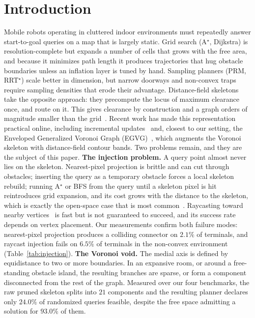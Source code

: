 \documentclass[conference]{IEEEtran}
\begin{document}
\section{Introduction}
Mobile robots operating in cluttered indoor environments must repeatedly answer start-to-goal queries on a map that is largely static. Grid search (A$^\star$, Dijkstra) is resolution-complete but expands a number of cells that grows with the free area, and because it minimizes path length it produces trajectories that hug obstacle boundaries unless an inflation layer is tuned by hand. Sampling planners (PRM, RRT$^\star$) scale better in dimension, but narrow doorways and non-convex traps require sampling densities that erode their advantage.
Distance-field skeletons take the opposite approach: they precompute the locus of maximum clearance once, and route on it. This gives clearance by construction and a graph orders of magnitude smaller than the grid~\cite{lau2013,oleynikova2018,qi2022pruned}. Recent work has made this representation practical online, including incremental updates~\cite{lau2013} and, closest to our setting, the Enveloped Generalized Voronoi Graph (EGVG)~\cite{qi2025egvg}, which augments the Voronoi skeleton with distance-field contour bands.
Two problems remain, and they are the subject of this paper.
\textbf{The injection problem.} A query point almost never lies on the skeleton. Nearest-pixel projection is brittle and can cut through obstacles; inserting the query as a temporary obstacle forces a local skeleton rebuild; running A$^\star$ or BFS from the query until a skeleton pixel is hit reintroduces grid expansion, and its cost grows with the distance to the skeleton, which is exactly the open-space case that is most common~\cite{qi2025egvg,oleynikova2018}. Raycasting toward nearby vertices~\cite{qi2025egvg} is fast but is not guaranteed to succeed, and its success rate depends on vertex placement. Our measurements confirm both failure modes: nearest-pixel projection produces a colliding connector on $2.1\%$ of terminals, and raycast injection fails on $6.5\%$ of terminals in the non-convex environment (Table~\ref{tab:injection}).
\textbf{The Voronoi void.} The medial axis is defined by equidistance to two or more boundaries. In an expansive room, or around a free-standing obstacle island, the resulting branches are sparse, or form a component disconnected from the rest of the graph. Measured over our four benchmarks, the raw pruned skeleton splits into $21$ components and the resulting planner declares only $24.0\%$ of randomized queries feasible, despite the free space admitting a solution for $93.0\%$ of them.
\end{document}
